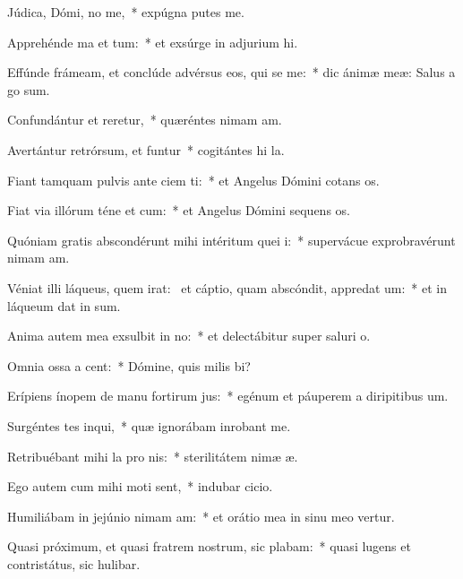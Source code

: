 \item Júdica, Dómi, no me,~* expúgna putes me.
\item Apprehénde ma et tum:~* et exsúrge in adjurium hi.
\item Effúnde frámeam, et conclúde advérsus eos, qui se me:~* dic ánimæ meæ: Salus a go sum.
\item Confundántur et reretur,~* quæréntes nimam am.
\item Avertántur retrórsum, et funtur~* cogitántes hi la.
\item Fiant tamquam pulvis ante ciem ti:~* et Angelus Dómini cotans os.
\item Fiat via illórum téne et cum:~* et Angelus Dómini sequens os.
\item Quóniam gratis abscondérunt mihi intéritum quei i:~* supervácue exprobravérunt nimam am.
\item Véniat illi láqueus, quem irat:~\pscross{} et cáptio, quam abscóndit, appredat um:~* et in láqueum dat in sum.
\item Anima autem mea exsulbit in no:~* et delectábitur super saluri o.
\item Omnia ossa a cent:~* Dómine, quis milis bi?
\item Erípiens ínopem de manu fortirum jus:~* egénum et páuperem a diripitibus um.
\item Surgéntes tes inqui,~* quæ ignorábam inrobant me.
\item Retribuébant mihi la pro nis:~* sterilitátem nimæ æ.
\item Ego autem cum mihi moti sent,~* indubar cicio.
\item Humiliábam in jejúnio nimam am:~* et orátio mea in sinu meo vertur.
\item Quasi próximum, et quasi fratrem nostrum, sic plabam:~* quasi lugens et contristátus, sic hulibar.
